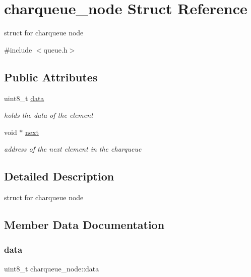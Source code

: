 \hypertarget{structcharqueue__node}{}\section{charqueue\+\_\+node Struct Reference}
\label{structcharqueue__node}


struct for charqueue node  




{\ttfamily \#include $<$queue.\+h$>$}

\subsection*{Public Attributes}
\begin{DoxyCompactItemize}
\item 
uint8\+\_\+t \hyperlink{structcharqueue__node_afc33ae43fe57024bb65f1cebf60c5b7f}{data}
\begin{DoxyCompactList}\small\item\em holds the data of the element \end{DoxyCompactList}\item 
void $\ast$ \hyperlink{structcharqueue__node_ab9d47897aacd373697e5083ae4bccd7d}{next}
\begin{DoxyCompactList}\small\item\em address of the next element in the charqueue \end{DoxyCompactList}\end{DoxyCompactItemize}


\subsection{Detailed Description}
struct for charqueue node 

\subsection{Member Data Documentation}
\mbox{\label{structcharqueue__node_afc33ae43fe57024bb65f1cebf60c5b7f}} 
\subsubsection{\texorpdfstring{data}{data}}
{\footnotesize\ttfamily uint8\+\_\+t charqueue\+\_\+node\+::data}



